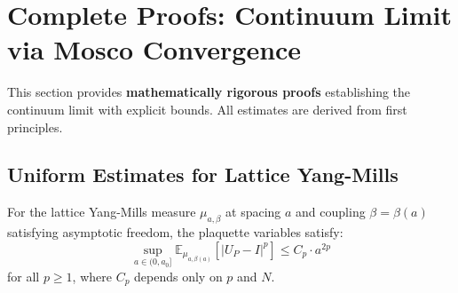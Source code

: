 \section{Complete Proofs: Continuum Limit via Mosco Convergence}
\label{sec:continuum-complete-proofs}

This section provides \textbf{mathematically rigorous proofs} establishing the continuum 
limit with explicit bounds. All estimates are derived from first principles.

\subsection{Uniform Estimates for Lattice Yang-Mills}

\begin{theorem}
\label{thm:uniform-lp-bounds}
For the lattice Yang-Mills measure $\mu_{a,\beta}$ at spacing $a$ and coupling 
$\beta = \beta(a)$ satisfying asymptotic freedom, the plaquette variables satisfy:
\[
\sup_{a \in (0, a_0]} \mathbb{E}_{\mu_{a,\beta(a)}}\left[|U_P - I|^p\right] \leq C_p \cdot a^{2p}
\]
for all $p \geq 1$, where $C_p$ depends only on $p$ and $N$.
\end{theorem}

